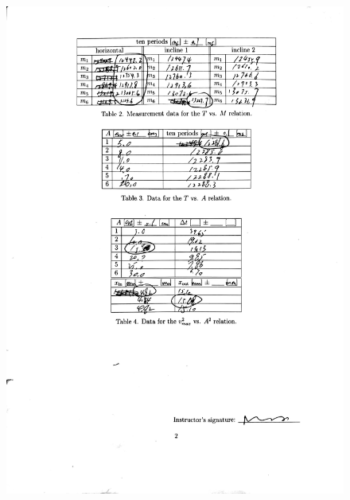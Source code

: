 \documentclass[a4paper]{report}
\begin{document}
	\begin{figure}[H]
		\centering
		\includegraphics[width=1\linewidth]{14.jpg}
	\end{figure}
\end{document}
